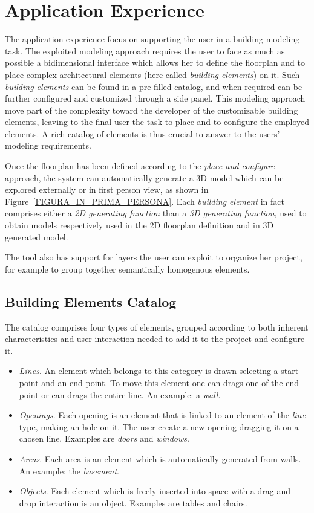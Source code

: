 \section{Application Experience}\label{sec:application}

The application experience focus on supporting the user in a building modeling task. The exploited modeling approach requires the user to face as much as possible a bidimensional interface which allows her to define the floorplan and to place complex architectural elements (here called \emph{building elements}) on it. Such \emph{building elements} can be found in a pre-filled catalog, and when required can be further configured and customized through a side panel. This modeling approach move part of the complexity toward the developer of the customizable building elements, leaving to the final user the task to place and to configure the employed elements. A rich catalog of elements is thus crucial to answer to the users' modeling requirements.

Once the floorplan has been defined according to the \emph{place-and-configure} approach, the system can automatically generate a 3D model which can be explored externally or in first person view, as shown in Figure~\ref{FIGURA_IN_PRIMA_PERSONA}. Each  \emph{building element} in fact comprises either a \emph{2D generating function} than a \emph{3D generating function}, used to obtain models respectively used in the 2D floorplan definition and in 3D generated model.

The tool also has support for layers the user can exploit to organize her project, for example to group together semantically homogenous elements.

\subsection{Building Elements Catalog}\label{ssec:elements}

The catalog comprises four types of elements, grouped according to both inherent characteristics and user interaction needed to add it to the project and configure it.

\begin{itemize}
\item \emph{Lines}. An element which belongs to this category is drawn selecting a start point and an end point. To move this element one can drags one of the end point or can drags the entire line. An example: a \emph{wall}.

\item \emph{Openings}. Each opening is an element that is linked to an element of the \emph{line} type, making an hole on it. The user create a new opening dragging it on a chosen line. Examples are \emph{doors} and \emph{windows}.

\item \emph{Areas}. Each area is an element which is automatically generated from walls. An example: the \emph{basement}.

\item \emph{Objects}. Each element which is freely inserted into space with a drag and drop interaction is an object. Examples are tables and chairs.
\end{itemize}

